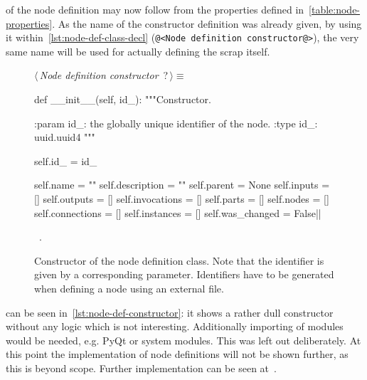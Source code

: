 \documentclass[%
    a4paper,    %
    justified,  %
    nobib,      %
    openany     %
]{tufte-book}
\makeatletter
\renewcommand{\label}[1]{\@tufte@label{##1}}%
\makeatother
\begin{document}
 of the node definition may now follow
from the properties defined in~\autoref{table:node-properties}. As the name of
the constructor definition was already given, by using it
within~\autoref{lst:node-def-class-decl}
(\verb|@<Node definition constructor@>|), the very same name will be used for
actually defining the scrap itself.

\begin{figure}[!htbp]
  \begin{flushleft} \small
\begin{minipage}{\linewidth}\label{scrap2}\raggedright\small
{} $\langle\,${\itshape Node definition constructor}\nobreak\ {\footnotesize {?}}$\,\rangle\equiv$
\vspace{-1ex}
\begin{pythoncode}
def __init__(self, id_):
    """Constructor.

    :param id_: the globally unique identifier of the node.
    :type  id_: uuid.uuid4
    """

    self.id_         = id_

    self.name        = ""
    self.description = ""
    self.parent      = None
    self.inputs      = []
    self.outputs     = []
    self.invocations = []
    self.parts       = []
    self.nodes       = []
    self.connections = []
    self.instances   = []
    self.was_changed = False|\NWsep|
\end{pythoncode}
\vspace{1.5ex}
\footnotesize
\begin{list}{}{\setlength{\itemsep}{-\parsep}\setlength{\itemindent}{-\leftmargin}}
\item \NWtxtMacroRefIn\ .

\item{}
\end{list}
\end{minipage}\vspace{4ex}
\end{flushleft}
\caption{Constructor of the node definition class. Note that the
    identifier is given by a corresponding parameter. Identifiers have to be
    generated when defining a node using an external file.}
  \label{lst:node-def-constructor}
\end{figure}

 can be seen
in~\cref{lst:node-def-constructor}: it shows a rather dull constructor without
any logic which is not interesting. Additionally importing of modules would be
needed, e.g. PyQt or system modules. This was left out deliberately. At this
point the implementation of node definitions will not be shown further, as this
is beyond scope. Further implementation can be seen at~.
\end{document}
